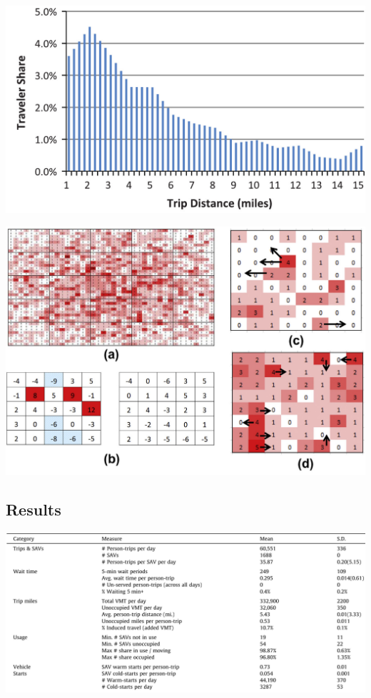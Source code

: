 \documentclass{beamer}
\begin{document}
\begin{frame}
  \includegraphics[width=\textwidth]{Fagnant-fig-1.jpg}
\end{frame}

\begin{frame}
  \includegraphics[width=\textwidth]{Fagnant-fig-4.jpg}
\end{frame}

\subsection{Results}

\begin{frame}
  \includegraphics[width=\textwidth]{Fagnant-table-2.jpg}
\end{frame}
\end{document}
